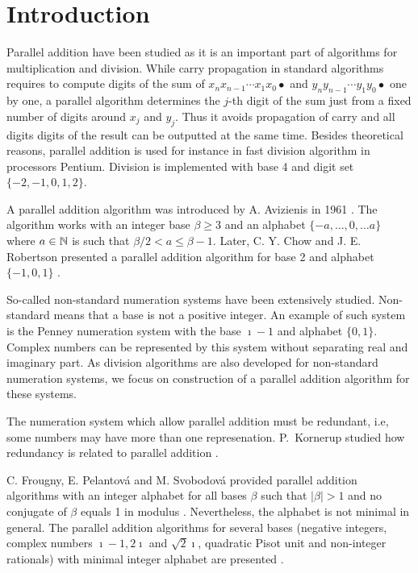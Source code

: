 \documentclass[11pt,a4paper]{report}	%
\theoremstyle{definition}
\begin{document}
\tableofcontents


\chapter*{Introduction}
Parallel addition have been studied as it is an important part of algorithms for multiplication and division. 
While carry propagation in standard algorithms requires to compute digits of the sum of $x_n x_{n-1}\cdots x_1 x_0 \bullet$ and $y_n y_{n-1}\cdots y_1 y_0 \bullet$  one by one, a parallel algorithm determines the $j$-th digit of the sum just from a fixed number of digits around $x_j$ and $y_j$. Thus it avoids propagation of carry and all digits digits of the result can be outputted at the same time. Besides theoretical reasons, parallel addition is used for instance in fast division algorithm in processors Pentium. Division is implemented with base 4 and digit set $\{-2,-1,0,1,2\}$.

A parallel addition algorithm  was introduced by A. Avizienis in 1961 \cite{avizienis}. The algorithm works with an integer base $\beta\geq3$ and an alphabet $\{-a, \dots, 0, \dots a\}$ where $a\in\mathbb{N}$ is such that $\beta/2 <a \leq \beta-1$. Later, C. Y. Chow and J. E. Robertson presented a parallel addition algorithm for  base 2 and alphabet $\{-1,0,1\}$ \cite{chow}.

So-called non-standard numeration systems have been extensively studied. Non-standard means that a base is not a positive integer. An example of such system is the Penney numeration system with the base $\imath-1$ and alphabet $\{0,1\}$. Complex numbers can be represented by this system without separating real and imaginary part. As division algorithms are also developed for non-standard numeration systems, we focus on construction of a parallel addition algorithm for these systems.

The numeration system which allow parallel addition must be redundant, i.e, some numbers may have more than one represenation. P.~Kornerup studied how  redundancy is related to parallel addition \cite{kornerup}. 

C. Frougny, E. Pelantov\'a and M. Svobodov\'a provided parallel addition algorithms with an integer alphabet for all bases $\beta$ such that $|\beta|>1$ and no conjugate of $\beta$ equals 1 in modulus \cite{parAddNS}. Nevertheless, the alphabet is not minimal in general.
 The parallel addition algorithms for several bases (negative integers, complex numbers $\imath-1, 2\imath$ and $\sqrt{2}\imath$, quadratic Pisot unit and  non-integer rationals) with minimal integer alphabet are presented \cite{minAlph}.
 
\end{document}
